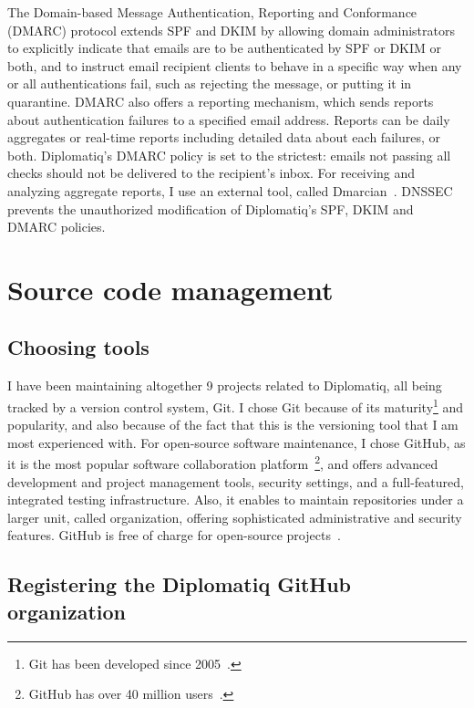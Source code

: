 The Domain-based Message Authentication, Reporting and Conformance (DMARC) protocol extends SPF and DKIM by allowing domain administrators to explicitly indicate that emails are to be authenticated by SPF or DKIM or both, and to instruct email recipient clients to behave in a specific way when any or all authentications fail, such as rejecting the message, or putting it in quarantine. DMARC also offers a reporting mechanism, which sends reports about authentication failures to a specified email address. Reports can be daily aggregates or real-time  reports including detailed data about each failures, or both. Diplomatiq's DMARC policy is set to the strictest: emails not passing all checks should not be delivered to the recipient's inbox. For receiving and analyzing aggregate reports, I use an external tool, called Dmarcian~\cite{dmarcian-website}. DNSSEC prevents the unauthorized modification of Diplomatiq's SPF, DKIM and DMARC policies.

\section{Source code management}

\subsection{Choosing tools}

I have been maintaining altogether 9 projects related to Diplomatiq, all being tracked by a version control system, Git. I chose Git because of its maturity\footnote{Git has been developed since 2005~\cite{git-initial-commit}.} and popularity, and also because of the fact that this is the versioning tool that I am most experienced with. For open-source software maintenance, I chose GitHub, as it is the most popular software collaboration platform~\footnote{GitHub has over 40 million users~\cite{github-user-count}.}, and offers advanced development and project management tools, security settings, and a full-featured, integrated testing infrastructure. Also, it enables to maintain repositories under a larger unit, called organization, offering sophisticated administrative and security features. GitHub is free of charge for open-source projects~\cite{github-pricing}.

\subsection{Registering the Diplomatiq GitHub organization}

